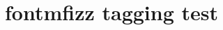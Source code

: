 \documentclass{article}
\title{fontmfizz tagging test}
\begin{document}
\mfAntenna

\mfMssql

\mfWordpress
\end{document}
